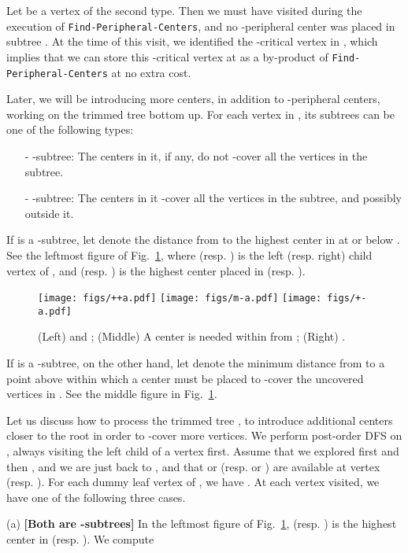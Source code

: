 \documentclass{llncs}
\begin{document}
{Let  be a vertex of the second type.
Then we must have visited  during the execution of {\tt Find-Peripheral-Centers},
and no -peripheral center was placed in subtree .
At the time of this visit,
we identified the -critical vertex in ,
which implies that we can store this -critical vertex at  as a by-product of
{\tt Find-Peripheral-Centers} at no extra cost.

Later, we will be introducing more centers, in addition to -peripheral centers,
working on the trimmed tree  bottom up.
For each vertex in ,
its subtrees can be one of the following types:
\begin{enumerate}
\item[-]
-subtree: The centers in it, if any, do not -cover all the vertices in the subtree.
\item[-]
-subtree: The centers in it -cover all the vertices in the subtree, and possibly outside it.
\end{enumerate}


If  is a -subtree,
let  denote the distance from  to the highest center in 
at or below .
See the leftmost figure of Fig.~\ref{fig:covering1},
where  (resp. ) is the left (resp. right) child vertex of ,
and  (resp. ) is the highest center placed in  (resp. ).
\begin{figure}[ht]
\centering
\texttt{[image: figs/++a.pdf]}
\hspace{8mm}
\texttt{[image: figs/m-a.pdf]}
\hspace{8mm}
\texttt{[image: figs/+-a.pdf]}
\caption{(Left)  and ; 
(Middle) A center is needed within  from ;
(Right) .
}
\label{fig:covering1}
\end{figure}
If  is a -subtree,
on the other hand,
let  denote the minimum distance from  to a point above 
within which a center must be placed to -cover the uncovered vertices in .
See the middle figure in Fig.~\ref{fig:covering1}.


Let us discuss how to process the trimmed tree ,
to introduce additional centers closer to the root in order to -cover more vertices.
We perform post-order DFS on ,
always visiting the left child of a vertex first.
Assume that we explored  first and then ,
and we are just back to ,
and that  or  (resp.  or )
are available at vertex  (resp. ).
For each dummy leaf vertex  of ,
we have .
At each vertex  visited, we have one of the following three cases.

(a) {\bf [Both are -subtrees]}
In the leftmost figure of Fig.~\ref{fig:covering1},
 (resp. ) is the highest center in  (resp. ).
We compute 

}
\end{document}
